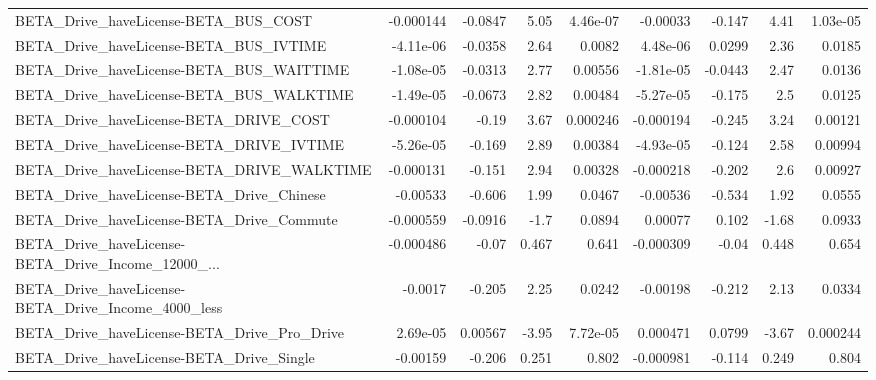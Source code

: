 \begin{tabular}{lrrrrrrrr}
BETA\_Drive\_haveLicense-BETA\_BUS\_COST               &   -0.000144 &      -0.0847 &      5.05 & 4.46e-07 &   -0.00033 &      -0.147 &         4.41 &      1.03e-05 \\
BETA\_Drive\_haveLicense-BETA\_BUS\_IVTIME             &   -4.11e-06 &      -0.0358 &      2.64 &   0.0082 &   4.48e-06 &      0.0299 &         2.36 &        0.0185 \\
BETA\_Drive\_haveLicense-BETA\_BUS\_WAITTIME           &   -1.08e-05 &      -0.0313 &      2.77 &  0.00556 &  -1.81e-05 &     -0.0443 &         2.47 &        0.0136 \\
BETA\_Drive\_haveLicense-BETA\_BUS\_WALKTIME           &   -1.49e-05 &      -0.0673 &      2.82 &  0.00484 &  -5.27e-05 &      -0.175 &          2.5 &        0.0125 \\
BETA\_Drive\_haveLicense-BETA\_DRIVE\_COST             &   -0.000104 &        -0.19 &      3.67 & 0.000246 &  -0.000194 &      -0.245 &         3.24 &       0.00121 \\
BETA\_Drive\_haveLicense-BETA\_DRIVE\_IVTIME           &   -5.26e-05 &       -0.169 &      2.89 &  0.00384 &  -4.93e-05 &      -0.124 &         2.58 &       0.00994 \\
BETA\_Drive\_haveLicense-BETA\_DRIVE\_WALKTIME         &   -0.000131 &       -0.151 &      2.94 &  0.00328 &  -0.000218 &      -0.202 &          2.6 &       0.00927 \\
BETA\_Drive\_haveLicense-BETA\_Drive\_Chinese          &    -0.00533 &       -0.606 &      1.99 &   0.0467 &   -0.00536 &      -0.534 &         1.92 &        0.0555 \\
BETA\_Drive\_haveLicense-BETA\_Drive\_Commute          &   -0.000559 &      -0.0916 &      -1.7 &   0.0894 &    0.00077 &       0.102 &        -1.68 &        0.0933 \\
BETA\_Drive\_haveLicense-BETA\_Drive\_Income\_12000\_... &   -0.000486 &        -0.07 &     0.467 &    0.641 &  -0.000309 &       -0.04 &        0.448 &         0.654 \\
BETA\_Drive\_haveLicense-BETA\_Drive\_Income\_4000\_less &     -0.0017 &       -0.205 &      2.25 &   0.0242 &   -0.00198 &      -0.212 &         2.13 &        0.0334 \\
BETA\_Drive\_haveLicense-BETA\_Drive\_Pro\_Drive        &    2.69e-05 &      0.00567 &     -3.95 & 7.72e-05 &   0.000471 &      0.0799 &        -3.67 &      0.000244 \\
BETA\_Drive\_haveLicense-BETA\_Drive\_Single           &    -0.00159 &       -0.206 &     0.251 &    0.802 &  -0.000981 &      -0.114 &        0.249 &         0.804 \\

\end{tabular}
